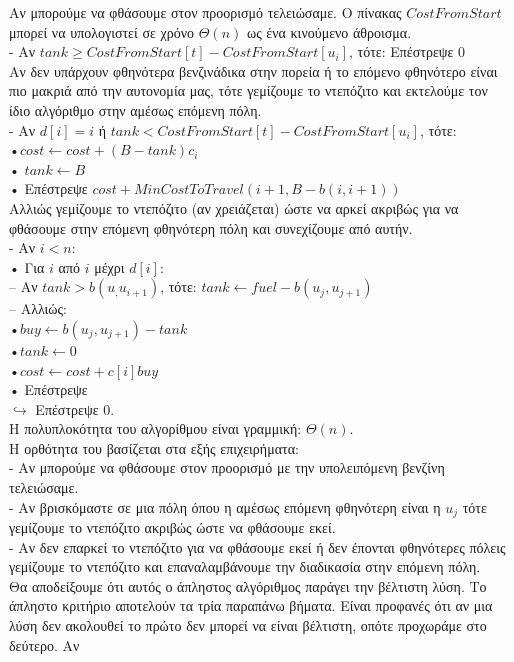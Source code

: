 \documentclass[11pt]{article}
\begin{document}
\begin{enumerate}
    Αν μπορούμε να φθάσουμε στον προορισμό τελειώσαμε. Ο πίνακας $CostFromStart$ μπορεί να υπολογιστεί σε χρόνο $Θ(n)$ ως ένα κινούμενο άθροισμα.\\
    - Αν $tank \geq CostFromStart[t] - CostFromStart[u_i]$, τότε: Επέστρεψε 0\\
    Αν δεν υπάρχουν φθηνότερα βενζινάδικα στην πορεία ή το επόμενο φθηνότερο είναι πιο μακριά
    από την αυτονομία μας, τότε γεμίζουμε το ντεπόζιτο και εκτελούμε τον ίδιο αλγόριθμο στην αμέσως επόμενη πόλη.\\
    - Αν $d[i] = i$  ή $tank < CostFromStart[t] -CostFromStart[u_i]$, τότε: \\
    •$cost \leftarrow cost + (B-tank)c_i$\\
    • $tank \leftarrow B$\\
    • Επέστρεψε $cost + MinCostToTravel(i+1,B-b(i,i+1))$\\
    Αλλιώς γεμίζουμε το ντεπόζιτο (αν χρειάζεται) ώστε να αρκεί ακριβώς για να φθάσουμε στην επόμενη φθηνότερη πόλη και συνεχίζουμε από αυτήν.\\
    - Αν $i <n $:\\
    • Για $i$ από $i$ μέχρι $d[i]$:\\
    – Αν $tank > b(u_,u_{i+1})$, τότε: $tank \leftarrow fuel -b(u_j,u_{j+1})$\\
    – Αλλιώς:\\ 
    •$buy \leftarrow b(u_j,u_{j+1}) -tank$\\
    •$tank \leftarrow 0$\\
    •$cost \leftarrow cost+c[i]buy$\\
    • Επέστρεψε \\
    $\hookrightarrow$ Επέστρεψε 0.\\
    Η πολυπλοκότητα του αλγορίθμου είναι γραμμική: $Θ(n)$.\\
    Η ορθότητα του βασίζεται στα εξής επιχειρήματα:\\
    - Αν μπορούμε να φθάσουμε στον προορισμό με την υπολειπόμενη βενζίνη τελειώσαμε.\\
    - Αν βρισκόμαστε σε μια πόλη όπου η αμέσως επόμενη φθηνότερη είναι η $u_j$ τότε γεμίζουμε το ντεπόζιτο ακριβώς ώστε να φθάσουμε εκεί.\\
    - Αν δεν επαρκεί το ντεπόζιτο για να φθάσουμε εκεί ή δεν έπονται φθηνότερες πόλεις γεμίζουμε το ντεπόζιτο και επαναλαμβάνουμε την διαδικασία στην επόμενη πόλη.\\
    Θα αποδείξουμε ότι αυτός ο άπληστος αλγόριθμος παράγει την βέλτιστη λύση. Το άπληστο κριτήριο αποτελούν τα τρία παραπάνω βήματα. Είναι προφανές ότι αν μια λύση δεν ακολουθεί το πρώτο δεν μπορεί να είναι βέλτιστη, οπότε προχωράμε στο δεύτερο. Αν

\end{enumerate}
\end{document}
